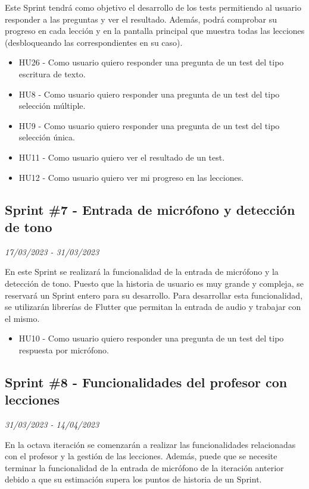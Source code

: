 Este Sprint tendrá como objetivo el desarrollo de los tests permitiendo al usuario responder a las preguntas y ver el resultado.
Además, podrá comprobar su progreso en cada lección y en la pantalla principal que muestra todas las lecciones (desbloqueando las correspondientes en su caso).
\begin{itemize}
    \item HU26 - Como usuario quiero responder una pregunta de un test del tipo escritura de texto.
    \item HU8 - Como usuario quiero responder una pregunta de un test del tipo selección múltiple.
    \item HU9 - Como usuario quiero responder una pregunta de un test del tipo selección única.
    \item HU11 - Como usuario quiero ver el resultado de un test.
    \item HU12 - Como usuario quiero ver mi progreso en las lecciones.

\end{itemize}

\subsection{Sprint \#7 - Entrada de micrófono y detección de tono}
\textit{17/03/2023   -   31/03/2023}

En este Sprint se realizará la funcionalidad de la entrada de micrófono y la detección de tono. Puesto que la historia de usuario es muy grande y compleja, se reservará
un Sprint entero para su desarrollo. Para desarrollar esta funcionalidad, se utilizarán librerías de Flutter que permitan la entrada de audio y trabajar con el mismo.
\begin{itemize}
    \item HU10 - Como usuario quiero responder una pregunta de un test del tipo respuesta por micrófono.
\end{itemize}

\subsection{Sprint \#8 - Funcionalidades del profesor con lecciones}
\textit{31/03/2023   -   14/04/2023}

En la octava iteración se comenzarán a realizar las funcionalidades relacionadas con el profesor y la gestión de las lecciones.
Además, puede que se necesite terminar la funcionalidad de la entrada de micrófono de la iteración anterior debido a que su estimación
supera los puntos de historia de un Sprint.


